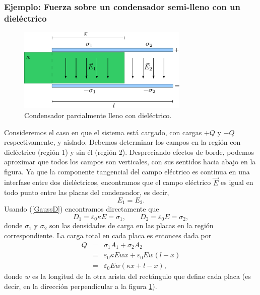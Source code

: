 \subsubsection{Ejemplo: Fuerza sobre un condensador semi-lleno con un
dieléctrico}
\begin{figure}[!h]
\centerline{\includegraphics[height=4cm]{fig/fig-condensador-semi-lleno-01.pdf}}
\caption{Condensador parcialmente lleno con dieléctrico.}
\label{fig:fccd}
\end{figure}
Consideremos el caso en que el sistema está cargado, con cargas $+Q$ y $-Q$
respectivamente, y aislado. Debemos determinar los campos en la región con
dieléctrico (región 1) y sin él (región 2). Despreciando efectos de borde,
podemos aproximar que todos los campos son verticales, con sus sentidos hacia
abajo en la figura. Ya que la componente tangencial del campo eléctrico es
continua en una interfase entre dos dieléctricos, encontramos que el campo
eléctrico $\vec{E}$ es igual en todo punto entre las placas del condensador,
es decir,
\begin{equation}
 E_1=E_2.
\end{equation}
Usando (\ref{GaussD}) encontramos directamente que
\begin{equation}
 D_1=\varepsilon_0\kappa E=\sigma_1, \qquad D_2=\varepsilon_0 E=\sigma_2,
\end{equation}
donde $\sigma_1$ y $\sigma_2$ son las densidades de carga en las placas en la
región correspondiente. La carga total en cada placa es entonces dada por
\begin{eqnarray}
 Q&=&\sigma_1A_1+\sigma_2A_2 \\
&=& \varepsilon_0\kappa E w x+\varepsilon_0E w (l-x) \\
&=& \varepsilon_0Ew\left(\kappa x+l-x\right), \label{Qej}
\end{eqnarray}
donde $w$ es la longitud de la otra arista del rectángulo que define cada placa (es decir, en la dirección perpendicular a la figura \ref{fig:fccd}).

